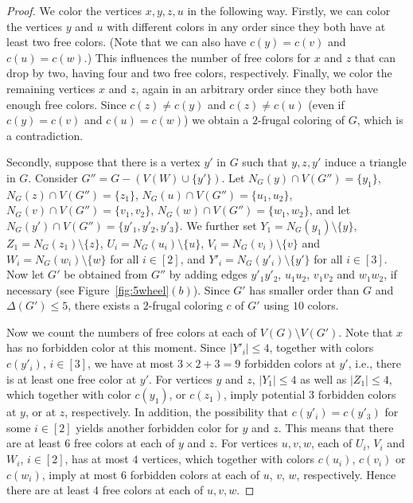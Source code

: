 \documentclass[10pt,a4paper]{article}
\begin{document}
\begin{proof}
We color the vertices $x,y,z,u$ in the following way. Firstly, we can color the vertices $y$ and $u$ with different colors in any order since they both have at least two free colors. (Note that we can also have $c(y)=c(v)$ and $c(u)=c(w)$.) This influences the number of free colors for $x$ and $z$ that can drop by two, having four and two free colors, respectively. Finally, we color the remaining vertices $x$ and $z$, again in an arbitrary order since they both have enough free colors. Since $c(z) \ne c(y)$ and $c(z) \ne c(u)$ (even if $c(y)=c(v)$ and $c(u)=c(w)$) we obtain a $2$-frugal coloring of $G$, which is a contradiction.

\medskip

Secondly, suppose that there is a vertex $y'$ in $G$ such that $y,z,y'$ induce a triangle in $G$. Consider $G''=G-(V(W)\cup \{y'\})$. Let $N_G(y) \cap V(G'')=\{y_1\}$, $N_G(z) \cap V(G'')=\{z_1\}$, $N_G(u) \cap V(G'')=\{u_1,u_2\}$, $N_G(v) \cap V(G'')=\{v_1,v_2\}$,  $N_G(w) \cap V(G'')=\{w_1,w_2\}$, and let $N_G(y') \cap V(G'')=\{y'_1,y'_2,y'_3\}$. We further set $Y_1=N_G(y_1)\setminus\{y\}$, $Z_1=N_G(z_1)\setminus\{z\}$,
$U_i=N_G(u_i)\setminus\{u\}$, $V_i=N_G(v_i)\setminus\{v\}$ and $W_i=N_G(w_i)\setminus\{w\}$ for all $i\in[2]$, and $Y'_i=N_G(y'_i)\setminus\{y'\}$  for all $i \in [3]$. Now let $G'$ be obtained from $G''$ by adding edges $y'_1y'_2$, $u_1u_2$, $v_1v_2$ and $w_1w_2$, if necessary (see Figure~\ref{fig:5wheel}$(b)$).  Since $G'$ has smaller order than $G$ and $\Delta(G') \le 5$, there exists a $2$-frugal coloring $c$ of $G'$ using $10$ colors. 

Now we count the numbers of free colors at each of $V(G)\setminus V(G')$. Note that $x$ has no forbidden color at this moment. Since $\vert Y'_i\vert \le 4$, together with colors $c(y'_i)$, $i\in [3]$, we have at most $3 \times 2+3=9$ forbidden colors at $y'$, i.e., there is at least one free color at $y'$. For vertices $y$ and $z$, $\vert Y_1\vert \le 4$ as well as $\vert Z_1 \vert \leq 4$, which together with color $c(y_1)$, or $c(z_1)$, imply potential $3$ forbidden colors at $y$, or at $z$, respectively. In addition, the possibility that $c(y'_i)=c(y'_3)$ for some $i\in [2]$ yields another forbidden color for $y$ and $z$. 
This means that there are at least $6$ free colors at each of $y$ and $z$. For vertices $u,v,w$, each of $U_i$, $V_i$ and $W_i$, $i\in [2]$, has at most $4$ vertices, which together with colors $c(u_i)$, $c(v_i)$ or $c(w_i)$, imply at most $6$ forbidden colors at each of $u$, $v$, $w$, respectively. Hence there are at least $4$ free colors at each of $u,v,w$.


\end{proof}
\end{document}
